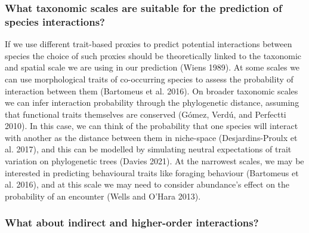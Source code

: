 \documentclass[11pt]{article}
\begin{document}
\hypertarget{what-taxonomic-scales-are-suitable-for-the-prediction-of-species-interactions}{%
\subsubsection{What taxonomic scales are suitable for the prediction of
species
interactions?}\label{what-taxonomic-scales-are-suitable-for-the-prediction-of-species-interactions}}

If we use different trait-based proxies to predict potential
interactions between species the choice of such proxies should be
theoretically linked to the taxonomic and spatial scale we are using in
our prediction (Wiens 1989). At some scales we can use morphological
traits of co-occurring species to assess the probability of interaction
between them (Bartomeus et al. 2016). On broader taxonomic scales we can
infer interaction probability through the phylogenetic distance,
assuming that functional traits themselves are conserved (Gómez, Verdú,
and Perfectti 2010). In this case, we can think of the probability that
one species will interact with another as the distance between them in
niche-space (Desjardins-Proulx et al. 2017), and this can be modelled by
simulating neutral expectations of trait variation on phylogenetic trees
(Davies 2021). At the narrowest scales, we may be interested in
predicting behavioural traits like foraging behaviour (Bartomeus et al.
2016), and at this scale we may need to consider abundance's effect on
the probability of an encounter (Wells and O'Hara 2013).

\hypertarget{what-about-indirect-and-higher-order-interactions}{%
\subsubsection{What about indirect and higher-order
interactions?}\label{what-about-indirect-and-higher-order-interactions}}
\end{document}

